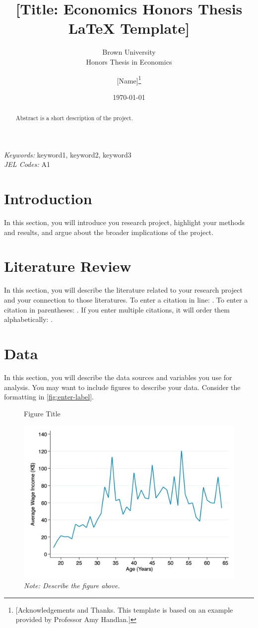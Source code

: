 \documentclass[12pt]{article}
\title{[Title: Economics Honors Thesis LaTeX Template]}
\subtitle{Brown University\\Honors Thesis in Economics}
\author{[Name]\thanks{[Acknowledgements and Thanks. This template is based on an example provided by Professor Amy Handlan.]}}
\date{\today}
\begin{document}
\maketitle

\begin{abstract}
    Abstract is a short description of the project.
\end{abstract} 
\doublespacing
\textit{Keywords:} keyword1, keyword2, keyword3
\\
\textit{JEL Codes:} A1 %
\newpage
{} 
 

\section{Introduction}
In this section, you will introduce you research project, highlight your methods and results, and argue about the broader implications of the project.

\section{Literature Review}
In this section, you will describe the literature related to your research project and your connection to those literatures. To enter a citation in line: \cite{CitationExample}. To enter a citation in parentheses: \citep{CitationExample}. If you enter multiple citations, it will order them alphabetically: \citep{CitationExample,WorkingPaperExample}.

\section{Data}
In this section, you will describe the data sources and variables you use for analysis. You may want to include figures to describe your data. Consider the formatting in \autoref{fig:enter-label}.

\begin{figure}[ht]
    \centering
    \caption{Figure Title}
    \label{fig:enter-label}
    \includegraphics[width=.75\textwidth]{../output/figures/avgwageincome_wage.jpg}
    \caption*{\footnotesize \textit{Note: Describe the figure above.}}
\end{figure}
\end{document}
